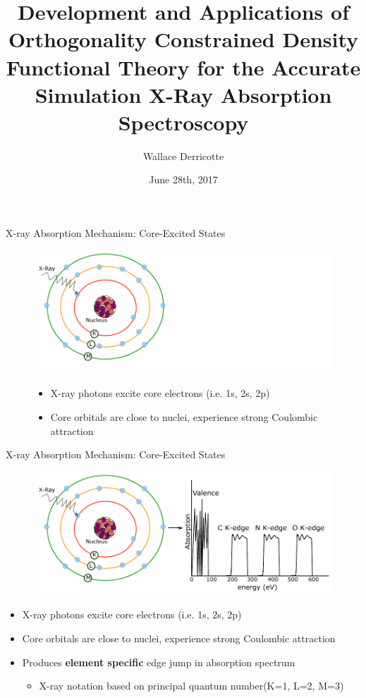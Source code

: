 \documentclass[t]{beamer}
\title[Simulating XAS in OCDFT]{Development and Applications of Orthogonality Constrained Density Functional Theory for the Accurate Simulation X-Ray Absorption Spectroscopy}
\author{Wallace Derricotte}
\institute{Dissertation Defense}
\date{June 28th, 2017}
\begin{document}

\begin{frame}
  \titlepage
\end{frame}

\begin{frame}{X-ray Absorption Mechanism: Core-Excited States}
\begin{figure}
\includegraphics[scale=0.7]{core_mechanism_1.pdf}
\begin{itemize}
\item X-ray photons excite core electrons (i.e. 1s, 2s, 2p)
\item Core orbitals are close to nuclei, experience strong Coulombic attraction
\end{itemize}
\end{figure}
\end{frame}

\begin{frame}{X-ray Absorption Mechanism: Core-Excited States}
\begin{figure}
\includegraphics[scale=0.7]{core_mechanism_2.pdf}
\end{figure}
\begin{itemize}
\item X-ray photons excite core electrons (i.e. 1s, 2s, 2p)
\item Core orbitals are close to nuclei, experience strong Coulombic attraction
\item Produces \textbf{element specific} edge jump in absorption spectrum
		\begin{itemize}
		\item X-ray notation based on principal quantum number\footnotemark (K=1, L=2, M=3)
		\end{itemize}
\end{itemize}
\end{frame}
\end{document}

